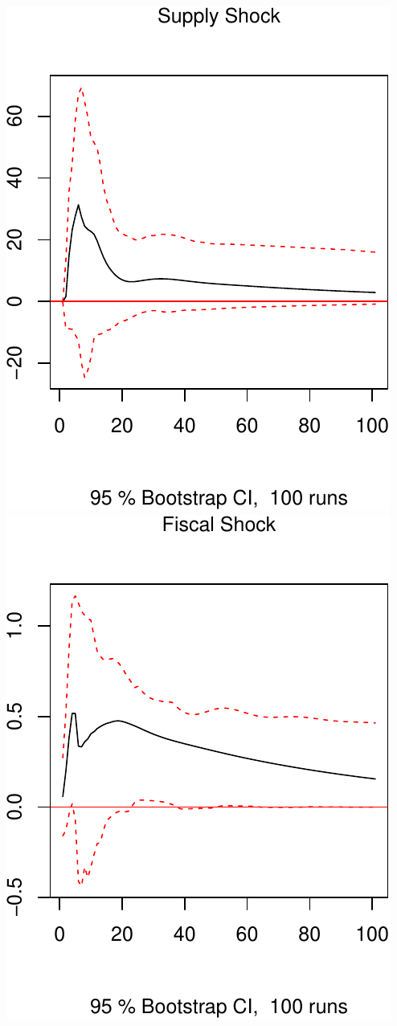 \documentclass[11pt,preprint, authoryear]{elsarticle}
\numberwithin{equation}{section}
\numberwithin{figure}{section}
\numberwithin{table}{section}
\begin{document}
\includegraphics{TS_proj_files/figure-latex/unnamed-chunk-40-1.pdf}
\includegraphics{TS_proj_files/figure-latex/unnamed-chunk-40-2.pdf}
\end{document}
